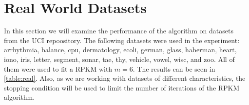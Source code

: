 \section{Real World Datasets}

In this section we will examine the performance of the algorithm on datasets from the UCI repoository. The following datasets were used in the experiment: arrhythmia, balance, cpu, dermatology, ecoli, german, glass, haberman, heart, iono, iris, letter, segment, sonar, tae, thy, vehicle, vowel, wisc, and zoo. All of them were used to fit a RPKM with $m=6$. The results can be seen in \ref{table:real}. Also, as we are working with datasets of different characteristics, the stopping condition will be used to limit the number of iterations of the RPKM algorithm.

\begin{table}[ht!]
    \centering
\end{table}
